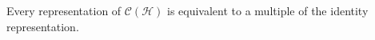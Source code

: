 Every representation of $\mathcal{C}(\mathcal{H})$ is equivalent to a multiple of the identity representation.
